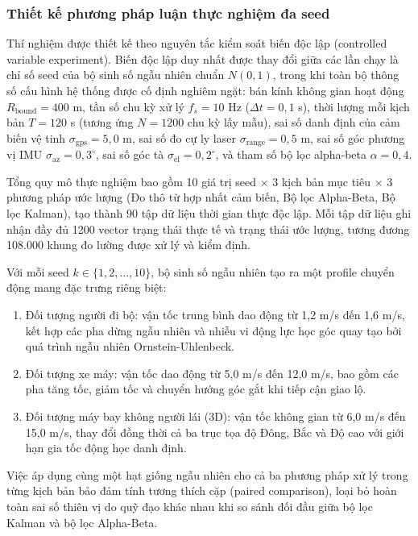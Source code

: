 \subsubsection{Thiết kế phương pháp luận thực nghiệm đa seed}

\hspace{0.5cm} Thí nghiệm được thiết kế theo nguyên tắc kiểm soát biến độc lập (controlled variable experiment). Biến độc lập duy nhất được thay đổi giữa các lần chạy là chỉ số seed của bộ sinh số ngẫu nhiên chuẩn $N(0, 1)$, trong khi toàn bộ thông số cấu hình hệ thống được cố định nghiêm ngặt: bán kính không gian hoạt động $R_{\text{bound}} = 400$ m, tần số chu kỳ xử lý $f_s = 10$ Hz ($\Delta t = 0{,}1$ s), thời lượng mỗi kịch bản $T = 120$ s (tương ứng $N = 1200$ chu kỳ lấy mẫu), sai số danh định của cảm biến vệ tinh $\sigma_{\text{gps}} = 5{,}0$ m, sai số đo cự ly laser $\sigma_{\text{range}} = 0{,}5$ m, sai số góc phương vị IMU $\sigma_{\text{az}} = 0{,}3^\circ$, sai số góc tà $\sigma_{\text{el}} = 0{,}2^\circ$, và tham số bộ lọc alpha-beta $\alpha = 0{,}4$.

Tổng quy mô thực nghiệm bao gồm 10 giá trị seed $\times$ 3 kịch bản mục tiêu $\times$ 3 phương pháp ước lượng (Đo thô từ hợp nhất cảm biến, Bộ lọc Alpha-Beta, Bộ lọc Kalman), tạo thành $90$ tập dữ liệu thời gian thực độc lập. Mỗi tập dữ liệu ghi nhận đầy đủ 1200 vector trạng thái thực tế và trạng thái ước lượng, tương đương 108.000 khung đo lường được xử lý và kiểm định.

Với mỗi seed $k \in \{1, 2, \dots, 10\}$, bộ sinh số ngẫu nhiên tạo ra một profile chuyển động mang đặc trưng riêng biệt:
\begin{enumerate}
    \item Đối tượng người đi bộ: vận tốc trung bình dao động từ 1,2 m/s đến 1,6 m/s, kết hợp các pha dừng ngẫu nhiên và nhiễu vi động lực học góc quay tạo bởi quá trình ngẫu nhiên Ornstein-Uhlenbeck.
    \item Đối tượng xe máy: vận tốc dao động từ 5,0 m/s đến 12,0 m/s, bao gồm các pha tăng tốc, giảm tốc và chuyển hướng góc gắt khi tiếp cận giao lộ.
    \item Đối tượng máy bay không người lái (3D): vận tốc không gian từ 6,0 m/s đến 15,0 m/s, thay đổi đồng thời cả ba trục tọa độ Đông, Bắc và Độ cao với giới hạn gia tốc động học danh định.
\end{enumerate}

Việc áp dụng cùng một hạt giống ngẫu nhiên cho cả ba phương pháp xử lý trong từng kịch bản bảo đảm tính tương thích cặp (paired comparison), loại bỏ hoàn toàn sai số thiên vị do quỹ đạo khác nhau khi so sánh đối đầu giữa bộ lọc Kalman và bộ lọc Alpha-Beta.

